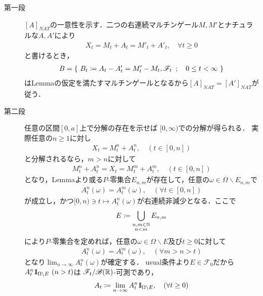 	\begin{prf}\mbox{}
		\begin{description}
			\item[第一段]
				$[A]_{NAT}$の一意性を示す．二つの右連続マルチンゲール$M,M'$とナチュラルな$A,A'$により
				\begin{align}
					X_t = M_t + A_t = M'_t + A'_t,
					\quad \forall t \geq 0
				\end{align}
				と書けるとき，
				\begin{align}
					B=\left\{\ B_t \coloneqq A_t - A'_t = M'_t - M_t,\mathscr{F}_t\ \, ; \quad 0 \leq t < \infty\ \right\}
				\end{align}
				はLemmaの仮定を満たすマルチンゲールとなるから$[A]_{NAT} = [A']_{NAT}$が従う．
				
			\item[第二段]
				任意の区間$[0,a]$上で分解の存在を示せば
				$[0,\infty)$での分解が得られる．
				実際任意の$n \geq 1$に対し
				\begin{align}
					X_t = M^n_t + A^n_t, \quad (t \in [0,n])
				\end{align}
				と分解されるなら，$m > n$に対して
				\begin{align}
					M^n_t + A^n_t = X_t = M^m_t + A^m_t, \quad (t \in [0,n])
				\end{align}
				となり，Lemmaより或る$P$-零集合$E_{n,m}$が存在して，任意の$\omega \in \Omega \backslash E_{n,m}$で
				\begin{align}
					A^n_t(\omega) = A^m_t(\omega), \quad (\forall t \in [0,n])
				\end{align}
				が成立し，かつ$[0,n) \ni t \longmapsto A^n_t(\omega)$が右連続非減少となる．ここで
				\begin{align}
					E \coloneqq \bigcup_{\substack{n,m \in \mathbb{N} \\ n<m}} E_{n,m}
				\end{align}
				により$P$-零集合を定めれば，任意の$\omega \in \Omega \backslash E$及び$t \geq 0$に対して
				\begin{align}
					A^n_t(\omega) = A^m_t(\omega), \quad (\forall m > n > t)
				\end{align}
				となり$\lim_{n \to \infty} A^n_t(\omega)$が確定する．
				usual条件より$E \in \mathscr{F}_0$だから$A^n_t \mbox{1}\hspace{-0.25em}\mbox{l}_{\Omega \backslash E}\ (n > t)$は
				$\mathscr{F}_t/\mathscr{B}(\mathbb{R})$-可測であり，
				\begin{align}
					A_t \coloneqq  \lim_{n \to \infty} A^n_t \mbox{1}\hspace{-0.25em}\mbox{l}_{\Omega \backslash E},
					\quad (\forall t \geq 0)
				\end{align}

\end{description}
\end{prf}
